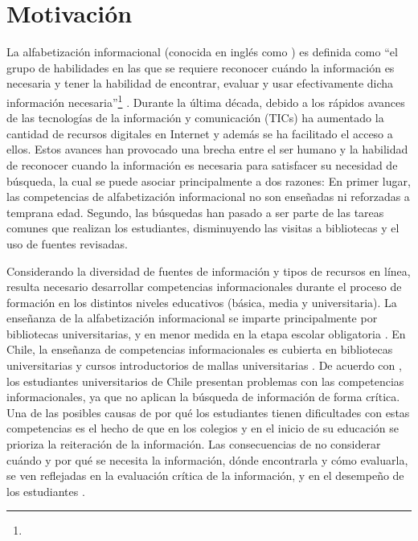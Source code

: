 \section{Motivación}
\label{sec:motivacion}
La alfabetización informacional (conocida en inglés como ) es definida como “el grupo de habilidades en las que se requiere reconocer cuándo la información es necesaria y tener la habilidad de encontrar, evaluar y usar efectivamente dicha información necesaria”\footnote{\traduccionlibre} \parencite[p.~2]{american2000information}. Durante la última década, debido a los rápidos avances de las tecnologías de la información y comunicación (TICs) ha aumentado la cantidad de recursos digitales en Internet y además se ha facilitado el acceso a ellos. Estos avances han provocado una brecha entre el ser humano y la habilidad de reconocer cuando la información es necesaria para satisfacer su necesidad de búsqueda, la cual se puede asociar principalmente a dos razones: En primer lugar, las competencias de alfabetización informacional no son enseñadas ni reforzadas a temprana edad. Segundo, las búsquedas  han pasado a ser parte de las tareas comunes que realizan los estudiantes, disminuyendo las visitas a bibliotecas y el uso de fuentes revisadas.

Considerando la diversidad de fuentes de información y tipos de recursos en línea, resulta necesario desarrollar competencias informacionales durante el proceso de formación en los distintos niveles educativos (básica, media y universitaria). La enseñanza de la alfabetización informacional se imparte principalmente por bibliotecas universitarias, y en menor medida en la etapa escolar obligatoria \parencite{weiner2014teaches}. En Chile, la enseñanza de competencias informacionales es cubierta en bibliotecas universitarias y cursos introductorios de mallas universitarias \parencite{marzal2015diagnostico}. De acuerdo con \textcite{urra2016alfabetizacion}, los estudiantes universitarios de Chile presentan problemas con las competencias informacionales, ya que no aplican la búsqueda de información de forma crítica. Una de las posibles causas de por qué los estudiantes tienen dificultades con estas competencias es el hecho de que en los colegios y en el inicio de su educación se prioriza la reiteración de la información. Las consecuencias de no considerar cuándo y por qué se necesita la información, dónde encontrarla y cómo evaluarla, se ven reflejadas en la evaluación crítica de la información, y en el desempeño de los estudiantes \parencite{urra2016alfabetizacion}. 

